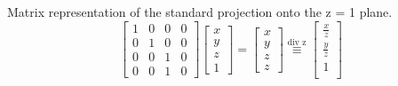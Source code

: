 \documentclass[conference]{IEEEtran}
\begin{document}
Matrix representation of the standard projection onto the z = 1 plane.
\begin{equation}
    \begin{bmatrix}
        1 & 0 & 0 & 0 \\
        0 & 1 & 0 & 0 \\
        0 & 0 & 1 & 0 \\
        0 & 0 & 1 & 0
    \end{bmatrix}
    \begin{bmatrix}
        x \\
        y \\
        z \\
        1
    \end{bmatrix}
    =
    \begin{bmatrix}
        x \\
        y \\
        z \\
        z
    \end{bmatrix}
    \overset{\text{div z}}{\equiv}
    \begin{bmatrix}
        \frac{x}{z} \\
        \frac{y}{z} \\
        1           \\
    \end{bmatrix}
\end{equation}
\end{document}

